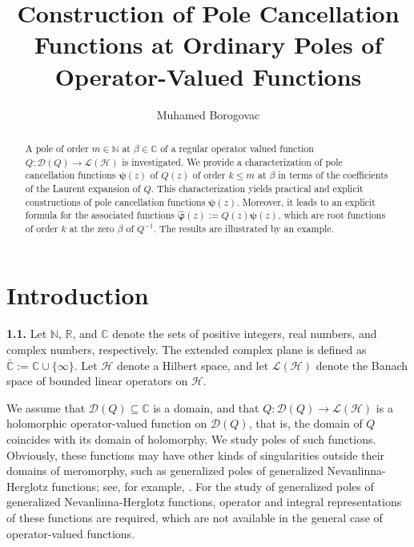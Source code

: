 \documentclass[11pt, reqno]{amsart}
\theoremstyle{plain}
\theoremstyle{remark}
\newcounter{str}
\numberwithin{equation}{section}
\begin{document}
\title[Construction of Pole Cancellation Functions]{Construction of Pole Cancellation Functions at Ordinary Poles of Operator-Valued Functions}
\author{Muhamed Borogovac}

\begin{abstract} 
A pole of order $m \in \mathbb{N}$ at $\beta \in \mathbb{C}$ of a regular operator valued function $Q : \mathcal{D}(Q) \to \mathcal{L}(\mathcal{H})$ is investigated. We provide a characterization of pole cancellation functions $\boldsymbol{\psi}(z)$ of $Q(z)$ of order $k \le m$ at $\beta$ in terms of the coefficients of the Laurent expansion of $Q$. This characterization yields practical and explicit constructions of pole cancellation functions $\boldsymbol{\psi}(z)$. Moreover, it leads to an explicit formula for the associated functions $\boldsymbol{\hat{\varphi}}(z) := Q(z)\boldsymbol{\psi}(z)$, which are root functions of order $k$ at the zero $\beta$ of $Q^{-1}$. The results are illustrated by an example.
\end{abstract}


\maketitle
\thispagestyle{empty}
\section{Introduction}\label{s2}

\textbf{1.1.}  Let $\mathbb{N}$, $\mathbb{R}$, and $\mathbb{C}$ denote the sets of positive integers, real numbers, and complex numbers, respectively. The extended complex plane is defined as $\bar{\mathbb{C}} := \mathbb{C} \cup \{\infty\}$. Let $\mathcal{H}$ denote a Hilbert space, and let $\mathcal{L}(\mathcal{H})$ denote the Banach space of bounded linear operators on $\mathcal{H}$. %

We assume that $\mathcal{D}(Q) \subseteq \mathbb{C}$ is a domain, and that $Q : \mathcal{D}(Q) \to \mathcal{L}(\mathcal{H})$ is a holomorphic operator-valued function on $\mathcal{D}(Q)$, that is, the domain of $Q$ coincides with its domain of holomorphy. We study poles of such functions. Obviously, these functions may have other kinds of singularities outside their domains of meromorphy, such as generalized poles of generalized Nevanlinna-Herglotz functions; see, for example, \cite{Lu3}. For the study of generalized poles of generalized Nevanlinna-Herglotz
functions, operator and integral representations of these functions are required, which are not available in the general case of operator-valued functions.
\end{document}
